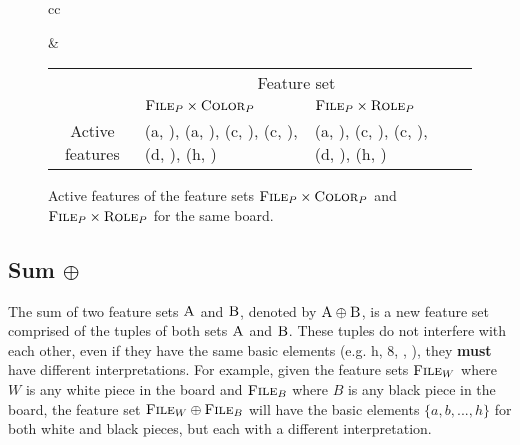 \begin{figure}[h]
\centering

\begin{tabular}{cc}
\raisebox{-7ex}{
\chessboard[
    tinyboard,
    showmover=false,
    hlabel=false,
    setwhite={kc3, nc2, pa2, Pd4},
    addblack={Kc8,bh7, pa7}
]
}

&

\begin{tabular}{|c|p{4cm}|p{4cm}|p{0cm}}
\cline{2-3}
\multicolumn{1}{c|}{} & \multicolumn{2}{c|}{\centering Feature set} \\
\cline{2-3}
\multicolumn{1}{c|}{} & \centering $\textsc{File}_{P} \times \textsc{Color}_{P}$ & \centering $\textsc{File}_{P} \times \textsc{Role}_{P}$ & \\
\cline{1-3}
Active features &
(a, \white), (a, \black), (c, \black), (c, \white), (d, \white), (h, \black) &
(a, \sympawn), (c, \symking), (c, \symknight), (d, \sympawn), (h, \symbishop) \\
\cline{1-3}
\end{tabular}

\end{tabular}

\caption{Active features of the feature sets $\textsc{File}_{P} \times \textsc{Color}_{P}$ and $\textsc{File}_{P} \times \textsc{Role}_{P}$ for the same board.}
\label{fig:active_features}
\end{figure}


\subsection{Sum $\oplus$}


The sum of two feature sets $\textsc{A}$ and $\textsc{B}$, denoted by $\textsc{A} \oplus \textsc{B}$, is a new feature set comprised of the tuples of both sets $\textsc{A}$ and $\textsc{B}$. These tuples do not interfere with each other, even if they have the same basic elements (e.g. h, 8, \symrook, \black), they \textbf{must} have different interpretations.
For example, given the feature sets $\textsc{File}_{W}$ where $W$ is any white piece in the board and $\textsc{File}_{B}$ where $B$ is any black piece in the board, the feature set $\textsc{File}_{W} \oplus \textsc{File}_{B}$ will have the basic elements $\{a, b, ..., h\}$ for both white and black pieces, but each with a different interpretation.

